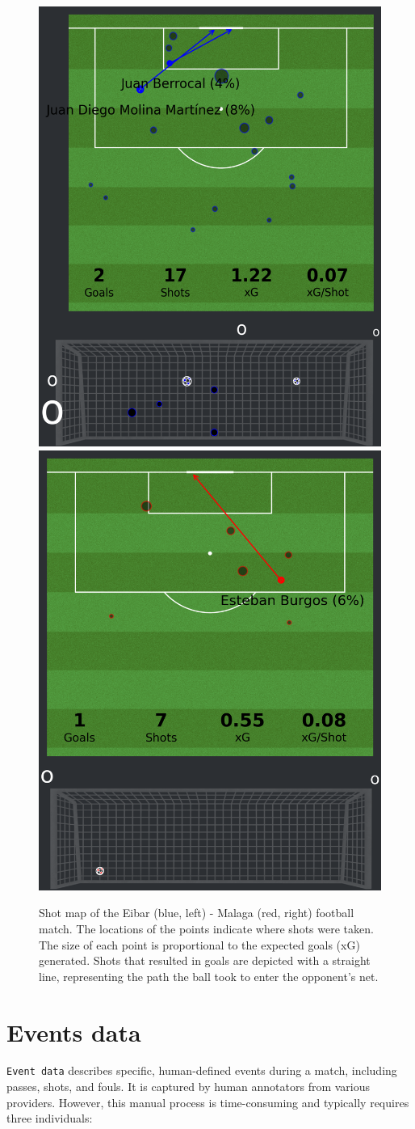 \documentclass[
  twoside,nohyper]{book}
\begin{document}
\begin{figure}[H]

{\centering \includegraphics[width=0.45\linewidth,]{imagenes/home_shot_map} \includegraphics[width=0.45\linewidth,]{imagenes/away_shot_map} 

}

\caption{Shot map of the Eibar (blue, left) - Malaga (red, right) football match. The locations of the points indicate where shots were taken. The size of each point is proportional to the expected goals (xG) generated. Shots that resulted in goals are depicted with a straight line, representing the path the ball took to enter the opponent’s net.}\label{fig:shotmap}
\end{figure}

\section{Events data}\label{events-data}

\texttt{Event\ data} describes specific, human-defined events during a match,
including passes, shots, and fouls. It is captured by human annotators
from various providers. However, this manual process is time-consuming
and typically requires three individuals:
\end{document}
